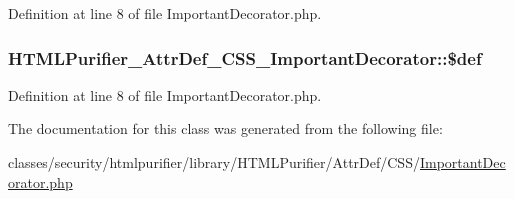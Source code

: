 Definition at line 8 of file Important\+Decorator.\+php.

\hypertarget{classHTMLPurifier__AttrDef__CSS__ImportantDecorator_a7c9714eb47d21aa5f443f1cb8e06dbca}{
\subsubsection[{\$def}]{\setlength{\rightskip}{0pt plus 5cm}H\+T\+M\+L\+Purifier\+\_\+\+Attr\+Def\+\_\+\+C\+S\+S\+\_\+\+Important\+Decorator\+::\$def}}\label{classHTMLPurifier__AttrDef__CSS__ImportantDecorator_a7c9714eb47d21aa5f443f1cb8e06dbca}


Definition at line 8 of file Important\+Decorator.\+php.



The documentation for this class was generated from the following file\+:\begin{DoxyCompactItemize}
\item 
classes/security/htmlpurifier/library/\+H\+T\+M\+L\+Purifier/\+Attr\+Def/\+C\+S\+S/\hyperlink{ImportantDecorator_8php}{Important\+Decorator.\+php}\end{DoxyCompactItemize}
